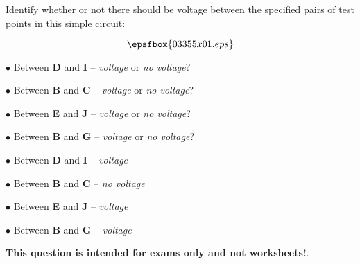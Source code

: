 

Identify whether or not there should be voltage between the specified pairs of test points in this simple circuit:

$$\epsfbox{03355x01.eps}$$

\medskip
\item{$\bullet$} Between {\bf D} and {\bf I} -- {\it voltage} or {\it no voltage}?
\item{$\bullet$} Between {\bf B} and {\bf C} -- {\it voltage} or {\it no voltage}?
\item{$\bullet$} Between {\bf E} and {\bf J} -- {\it voltage} or {\it no voltage}?
\item{$\bullet$} Between {\bf B} and {\bf G} -- {\it voltage} or {\it no voltage}?
\medskip







\medskip
\item{$\bullet$} Between {\bf D} and {\bf I} -- {\it voltage} 
\item{$\bullet$} Between {\bf B} and {\bf C} -- {\it no voltage}
\item{$\bullet$} Between {\bf E} and {\bf J} -- {\it voltage}
\item{$\bullet$} Between {\bf B} and {\bf G} -- {\it voltage}
\medskip







{\bf This question is intended for exams only and not worksheets!}.



